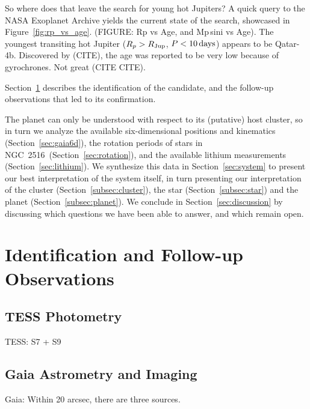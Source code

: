 \documentclass[12pt,twocolumn,tighten]{aastex63}
\newcommand{\cn}{NGC~2516} %
\begin{document}
So where does that leave the search for young hot Jupiters?
A quick query to the NASA Exoplanet Archive yields the current state
of the search, showcased in Figure~\ref{fig:rp_vs_age}.
(FIGURE: Rp vs Age, and Mp\,sini vs Age).
The youngest transiting hot Jupiter ($R_p>R_{\rm Jup}$, $P<10\,{\rm
days}$) appears to be Qatar-4b. 
Discovered by (CITE), the age was reported to be very low because of
gyrochrones.
Not great (CITE CITE).




Section~\ref{sec:observations} describes the identification of the
candidate, and the follow-up observations that led to its confirmation.

The planet can only be understood with respect to its (putative)
host cluster, so in turn we analyze the
available six-dimensional positions and kinematics (Section~\ref{sec:gaia6d}),
the rotation periods of stars in \cn\ 
(Section~\ref{sec:rotation}), and the available lithium measurements
(Section~\ref{sec:lithium}).
We synthesize this data in
Section~\ref{sec:system} to present our best interpretation of the
system itself, in turn presenting our interpretation of the
cluster
(Section~\ref{subsec:cluster}), the star (Section~\ref{subsec:star})
and the planet (Section~\ref{subsec:planet}).  We conclude in
Section~\ref{sec:discussion} by discussing which questions we have
been able to answer, and which remain open.



\section{Identification and Follow-up Observations}
\label{sec:observations}


  \subsection{TESS Photometry}
  \label{subsec:tess}
  TESS: S7 + S9

  \subsection{Gaia Astrometry and Imaging}
  \label{subsec:gaia}
  Gaia:
    Within 20 arcsec, there are three sources. 


\end{document}
